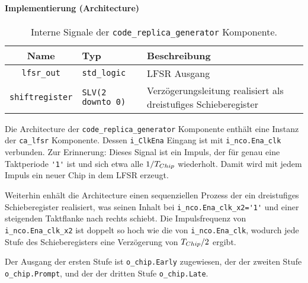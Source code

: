 
\paragraph{Implementierung (Architecture)}

\begin{table}[htbp]
    \ttabbox
    {
        \caption[Code Replika Generator interne Signale]{Interne Signale der \lstinline$code_replica_generator$ Komponente.}
        \label{TabCodeGen_ArchSignals}
    }
    {
    \begin{tabular}{c  p{2cm} p{6cm}}
        \toprule
        Name      & Typ         & Beschreibung \\
        \midrule
        \lstinline$lfsr_out$  & \lstinline$std_logic$             & LFSR Ausgang\\
        \lstinline$shiftregister$  & \lstinline$SLV(2 downto 0)$             &  Verzögerungsleitung realisiert als dreistufiges Schieberegister\\
        \bottomrule
    \end{tabular}
}
\end{table}

Die Architecture der \lstinline$code_replica_generator$ Komponente enthält eine Instanz der \lstinline$ca_lfsr$ Komponente. Dessen \lstinline$i_ClkEna$ Eingang ist mit \lstinline$i_nco.Ena_clk$ verbunden. Zur Erinnerung: Dieses Signal ist ein Impuls, der für genau eine Taktperiode \lstinline$'1'$ ist und sich etwa alle $1/{T}_{Chip}$ wiederholt. Damit wird mit jedem Impuls ein neuer Chip in dem \gls{LFSR} erzeugt.

Weiterhin enhält die Architecture einen sequenziellen Prozess der ein dreistufiges Schieberegister realisiert, was seinen Inhalt bei \lstinline$i_nco.Ena_clk_x2='1'$ und einer steigenden Taktflanke nach rechts schiebt. Die Impulsfrequenz von \lstinline$i_nco.Ena_clk_x2$ ist doppelt so hoch wie die von \lstinline$i_nco.Ena_clk$, wodurch jede Stufe des Schieberegisters eine Verzögerung von ${T}_{Chip} /2$ ergibt.

Der Ausgang der ersten Stufe ist \lstinline$o_chip.Early$ zugewiesen, der der zweiten Stufe \lstinline$o_chip.Prompt$, und der der dritten Stufe \lstinline$o_chip.Late$.
